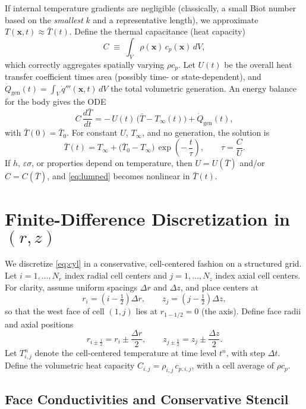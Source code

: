 \documentclass[11pt]{article}
\begin{document}
If internal temperature gradients are negligible (classically, a small Biot number based on the \emph{smallest} $k$ and a representative length), we approximate $T(\mathbf{x},t)\approx \bar{T}(t)$. Define the thermal capacitance (heat capacity)
\begin{equation}
C \;\equiv\; \int_V \rho(\mathbf{x})\,c_p(\mathbf{x})\, dV,
\label{eq:Cdef}
\end{equation}
which correctly aggregates spatially varying $\rho c_p$. Let $U(t)$ be the overall heat transfer coefficient times area (possibly time- or state-dependent), and $\dot{Q}_{\text{gen}}(t)=\int_V \dot{q}'''(\mathbf{x},t)\,dV$ the total volumetric generation. An energy balance for the body gives the ODE
\begin{equation}
C\,\frac{d\bar{T}}{dt} = -\,U(t)\,\big(\bar{T}-T_\infty(t)\big) + \dot{Q}_{\text{gen}}(t),
\label{eq:lumped}
\end{equation}
with $\bar{T}(0)=\bar{T}_0$. For constant $U$, $T_\infty$, and no generation, the solution is
\begin{equation}
\bar{T}(t)=T_\infty+\big(\bar{T}_0-T_\infty\big)\,\exp\!\left(-\,\frac{t}{\tau}\right),
\qquad
\tau=\frac{C}{U}.
\end{equation}
If $h$, $\varepsilon\sigma$, or properties depend on temperature, then $U=U(\bar{T})$ and/or $C=C(\bar{T})$, and \eqref{eq:lumped} becomes nonlinear in $\bar{T}(t)$.

\section{Finite-Difference Discretization in $(r,z)$}

We discretize \eqref{eq:cyl} in a conservative, cell-centered fashion on a structured grid. Let $i=1,\dots,N_r$ index radial cell centers and $j=1,\dots,N_z$ index axial cell centers. For clarity, assume uniform spacings $\Delta r$ and $\Delta z$, and place centers at
\[
r_i=\left(i-\tfrac{1}{2}\right)\Delta r,\qquad
z_j=\left(j-\tfrac{1}{2}\right)\Delta z,
\]
so that the west face of cell $(1,j)$ lies at $r_{1-1/2}=0$ (the axis). Define face radii and axial positions
\[
r_{i\pm\frac{1}{2}} = r_i \pm \frac{\Delta r}{2}, \qquad
z_{j\pm\frac{1}{2}} = z_j \pm \frac{\Delta z}{2}.
\]
Let $T_{i,j}^n$ denote the cell-centered temperature at time level $t^n$, with step $\Delta t$. Define the volumetric heat capacity $C_{i,j} = \rho_{i,j}\,c_{p,i,j}$, with a cell average of $\rho c_p$.

\subsection{Face Conductivities and Conservative Stencil}
\end{document}
